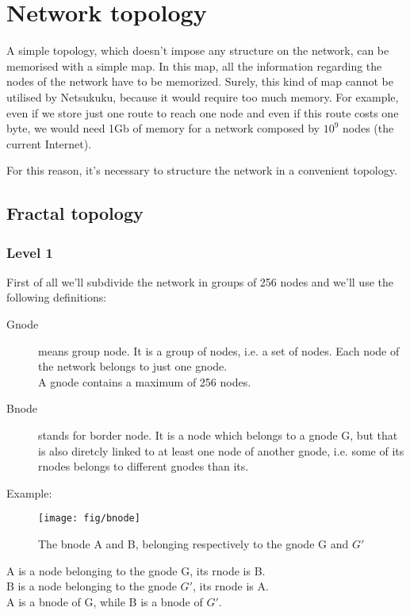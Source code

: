 \documentclass[a4paper]{article}
\begin{document}
\section{Network topology}
\label{sec:net_topology}

A simple topology, which doesn't impose any structure on the network, can be
memorised with a simple map. In this map, all the information regarding the
nodes of the network have to be memorized. Surely, this kind of map cannot be
utilised by Netsukuku, because it would require too much memory.
For example, even if we store just one route to reach one node and even if
this route costs one byte, we would need 1Gb of memory for a network composed
by $10^9$ nodes (the current Internet).

For this reason, it's necessary to structure the network in a convenient
topology.

\subsection{Fractal topology}
\label{sec:fractal_topology}
\subsubsection{Level 1}
First of all we'll subdivide the network in groups of 256 nodes and we'll use
the following definitions:
\begin{description}
	\item[Gnode] means group node. It is a group of nodes, i.e. a set of
		nodes. Each node of the network belongs to just one gnode.\\
		A gnode contains a maximum of 256 nodes.
	\item[Bnode] stands for border node. It is a node which belongs to a
		gnode G, but that is also diretcly linked to at least one node
		of another gnode, i.e. some of its rnodes belongs to different
		gnodes than its.
\end{description}

Example:\\
\begin{figure}[h]
	\begin{center}
		\texttt{[image: fig/bnode]}
	\end{center}
	\caption{The bnode A and B, belonging respectively to the gnode G and
	$G'$}
\end{figure}
A is a node belonging to the gnode G, its rnode is B.\\
B is a node belonging to the gnode $G'$, its rnode is A.\\
A is a bnode of G, while B is a bnode of $G'$.
\end{document}
